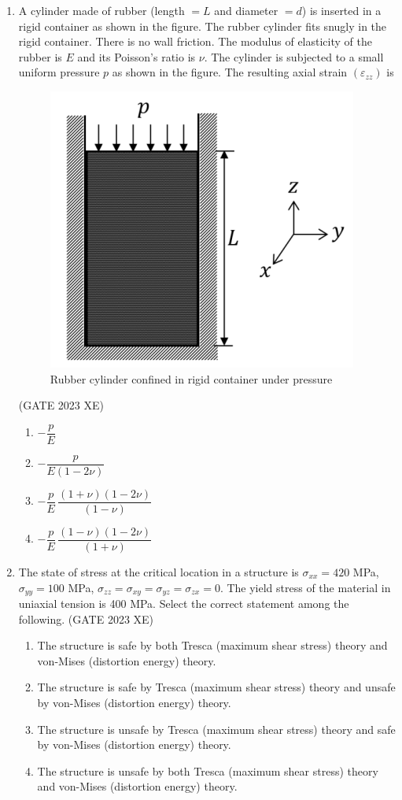 \documentclass[journal,12pt,onecolumn]{IEEEtran}
\begin{document}
\begin{enumerate}
\newpage

\item A cylinder made of rubber (length $=L$ and diameter $=d$) is inserted in a rigid
container as shown in the figure. The rubber cylinder fits snugly in the rigid
container. There is no wall friction. The modulus of elasticity of the rubber is $E$
and its Poisson’s ratio is $\nu$. The cylinder is subjected to a small uniform pressure $p$
as shown in the figure. The resulting axial strain $(\varepsilon_{zz})$ is\\

\begin{figure}[htbp]
\centering
\includegraphics[width=0.4\columnwidth]{figs/C/fig9.png}
\caption{Rubber cylinder confined in rigid container under pressure}
\label{fig:figs/C/fig9.png}
\end{figure}
\hfill{(GATE 2023 XE)}
\begin{multicols}{2}
\begin{enumerate}
\item $-\dfrac{p}{E}$
\item $-\dfrac{p}{E(1-2\nu)}$
\item $-\dfrac{p}{E}\,\dfrac{(1+\nu)(1-2\nu)}{(1-\nu)}$
\item $-\dfrac{p}{E}\,\dfrac{(1-\nu)(1-2\nu)}{(1+\nu)}$
\end{enumerate}
\end{multicols}

\item The state of stress at the critical location in a structure is $\sigma_{xx}=420$ MPa,
$\sigma_{yy}=100$ MPa, $\sigma_{zz}=\sigma_{xy}=\sigma_{yz}=\sigma_{zx}=0$. The yield stress of the material in
uniaxial tension is 400 MPa. Select the correct statement among the following.
\hfill{(GATE 2023 XE)}

\begin{multicols}{2}
\begin{enumerate}
\item The structure is safe by both Tresca (maximum shear stress) theory and von-Mises (distortion energy) theory.
\item The structure is safe by Tresca (maximum shear stress) theory and unsafe by von-Mises (distortion energy) theory.
\item The structure is unsafe by Tresca (maximum shear stress) theory and safe by von-Mises (distortion energy) theory.
\item The structure is unsafe by both Tresca (maximum shear stress) theory and von-Mises (distortion energy) theory.
\end{enumerate}
\end{multicols}


\end{enumerate}
\end{document}
